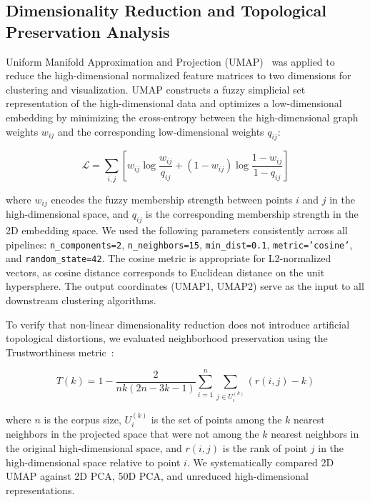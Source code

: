 \documentclass[a4paper,fleqn]{cas-dc}
\begin{document}
\subsection{Dimensionality Reduction and Topological Preservation Analysis}

Uniform Manifold Approximation and Projection (UMAP)~\cite{ref21} was applied to reduce the high-dimensional normalized feature matrices to two dimensions for clustering and visualization. UMAP constructs a fuzzy simplicial set representation of the high-dimensional data and optimizes a low-dimensional embedding by minimizing the cross-entropy between the high-dimensional graph weights $w_{ij}$ and the corresponding low-dimensional weights $q_{ij}$:

\begin{equation}
\mathcal{L} = \sum_{i,j} \left[ w_{ij} \log \frac{w_{ij}}{q_{ij}} + (1 - w_{ij}) \log \frac{1 - w_{ij}}{1 - q_{ij}} \right]
\end{equation}

where $w_{ij}$ encodes the fuzzy membership strength between points $i$ and $j$ in the high-dimensional space, and $q_{ij}$ is the corresponding membership strength in the 2D embedding space. We used the following parameters consistently across all pipelines: \texttt{n\_components=2}, \texttt{n\_neighbors=15}, \texttt{min\_dist=0.1}, \texttt{metric='cosine'}, and \texttt{random\_state=42}. The cosine metric is appropriate for L2-normalized vectors, as cosine distance corresponds to Euclidean distance on the unit hypersphere. The output coordinates (UMAP1, UMAP2) serve as the input to all downstream clustering algorithms.

To verify that non-linear dimensionality reduction does not introduce artificial topological distortions, we evaluated neighborhood preservation using the Trustworthiness metric~\cite{ref34}:

\begin{equation}
T(k) = 1 - \frac{2}{n k (2n - 3k - 1)} \sum_{i=1}^n \sum_{j \in U_i^{(k)}} (r(i,j) - k)
\end{equation}

where $n$ is the corpus size, $U_i^{(k)}$ is the set of points among the $k$ nearest neighbors in the projected space that were not among the $k$ nearest neighbors in the original high-dimensional space, and $r(i,j)$ is the rank of point $j$ in the high-dimensional space relative to point $i$. We systematically compared 2D UMAP against 2D PCA, 50D PCA, and unreduced high-dimensional representations.
\end{document}
